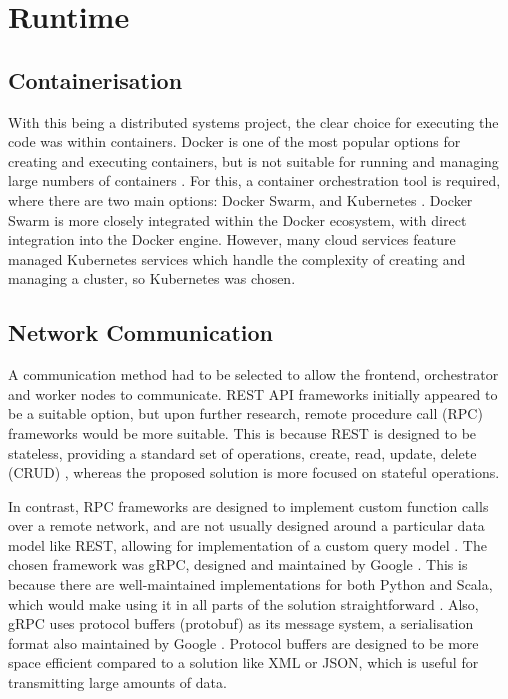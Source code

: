 \section{Runtime}
\subsection{Containerisation}
With this being a distributed systems project, the clear choice for executing the code was within containers. Docker is one of the most popular options for creating and executing containers, but is not suitable for running and managing large numbers of containers \cite{orchestrationdockerdocs}. For this, a container orchestration tool is required, where there are two main options: Docker Swarm, and Kubernetes \cite{dockerswarm, k8sapi}. Docker Swarm is more closely integrated within the Docker ecosystem, with direct integration into the Docker engine. However, many cloud services feature managed Kubernetes services which handle the complexity of creating and managing a cluster, so Kubernetes was chosen.

\subsection{Network Communication} 
A communication method had to be selected to allow the frontend, orchestrator and worker nodes to communicate. REST API frameworks initially appeared to be a suitable option, but upon further research, remote procedure call (RPC) frameworks would be more suitable. This is because REST is designed to be stateless, providing a standard set of operations, create, read, update, delete (CRUD) \cite{masse2011rest}, whereas the proposed solution is more focused on stateful operations.

In contrast, RPC frameworks are designed to implement custom function calls over a remote network, and are not usually designed around a particular data model like REST, allowing for implementation of a custom query model \cite{srinivasan1995rpc}. The chosen framework was gRPC, designed and maintained by Google \cite{gRPCapi}. This is because there are well-maintained implementations for both Python and Scala, which would make using it in all parts of the solution straightforward \cite{scalapbdocs}. Also, gRPC uses protocol buffers (protobuf) as its message system, a serialisation format also maintained by Google \cite{protobufdocs}. Protocol buffers are designed to be more space efficient compared to a solution like XML or JSON, which is useful for transmitting large amounts of data.


